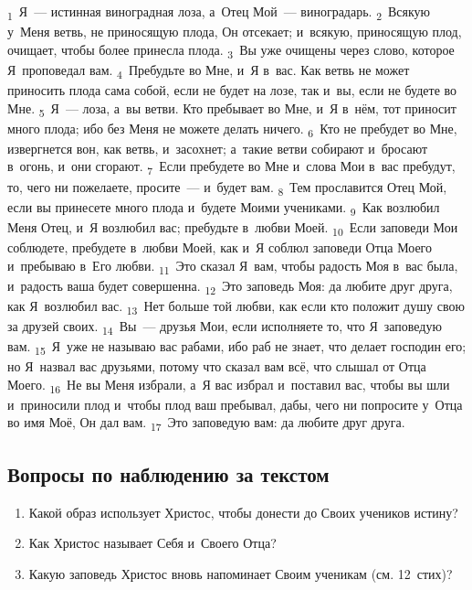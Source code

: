 \documentclass[a4paper,12pt]{article}
\begin{document}
\textsubscript{1}~Я~— истинная виноградная лоза, а~Отец Мой~— виноградарь. \textsubscript{2}~Всякую у~Меня ветвь, не приносящую плода, Он отсекает; и~всякую, приносящую плод, очищает, чтобы более принесла плода. \textsubscript{3}~Вы уже очищены через слово, которое Я~проповедал вам. \textsubscript{4}~Пребудьте во Мне, и~Я в~вас. Как ветвь не может приносить плода сама собой, если не будет на лозе, так и~вы, если не будете во Мне. \textsubscript{5}~Я~— лоза, а~вы ветви. Кто пребывает во Мне, и~Я в~нём, тот приносит много плода; ибо без Меня не можете делать ничего. \textsubscript{6}~Кто не пребудет во Мне, извергнется вон, как ветвь, и~засохнет; а~такие ветви собирают и~бросают в~огонь, и~они сгорают. \textsubscript{7}~Если пребудете во Мне и~слова Мои в~вас пребудут, то, чего ни пожелаете, просите~--- и~будет вам. \textsubscript{8}~Тем прославится Отец Мой, если вы принесете много плода и~будете Моими учениками. \textsubscript{9}~Как возлюбил Меня Отец, и~Я возлюбил вас; пребудьте в~любви Моей. \textsubscript{10}~Если заповеди Мои соблюдете, пребудете в~любви Моей, как и~Я соблюл заповеди Отца Моего и~пребываю в~Его любви. \textsubscript{11}~Это сказал Я~вам, чтобы радость Моя в~вас была, и~радость ваша будет совершенна. \textsubscript{12}~Это заповедь Моя: да любите друг друга, как Я~возлюбил вас. \textsubscript{13}~Нет больше той любви, как если кто положит душу свою за друзей своих. \textsubscript{14}~Вы~--- друзья Мои, если исполняете то, что Я~заповедую вам. \textsubscript{15}~Я~уже не называю вас рабами, ибо раб не знает, что делает господин его; но Я~назвал вас друзьями, потому что сказал вам всё, что слышал от Отца Моего. \textsubscript{16}~Не вы Меня избрали, а~Я вас избрал и~поставил вас, чтобы вы шли и~приносили плод и~чтобы плод ваш пребывал, дабы, чего ни попросите у~Отца во имя Моё, Он дал вам. \textsubscript{17}~Это заповедую вам: да любите друг друга. 

\subsection*{Вопросы по наблюдению за текстом}
\begin{enumerate}
    \item Какой образ использует Христос, чтобы донести до Своих учеников истину? 
    
    \myline
    
    \myline
    \item Как Христос называет Себя и~Своего Отца? 
    
    \myline
    
    \myline
    \item Какую заповедь Христос вновь напоминает Своим ученикам (см. 12~стих)? 
    
    \myline
    
    \myline
\end{enumerate}
\end{document}
